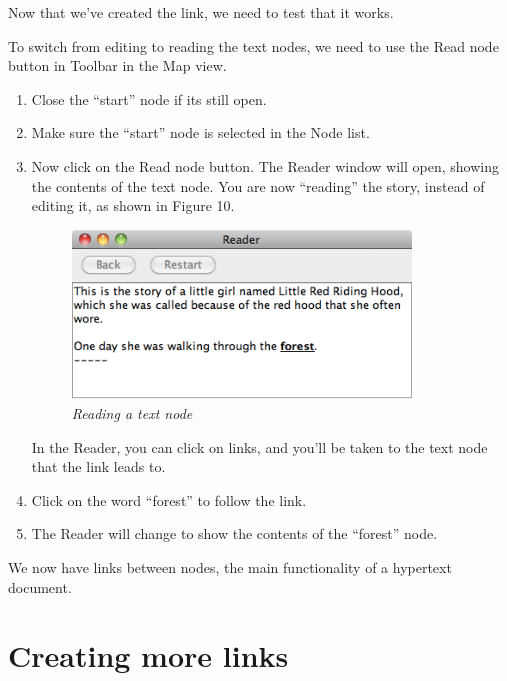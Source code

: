 \documentclass{article}
\begin{document}
Now that we've created the link, we need to test that it works.

To switch from editing to reading the text nodes, we need to use the Read node
button in Toolbar in the Map view.

\begin{enumerate}
  \item Close the ``start'' node if its still open.
  \item Make sure the ``start'' node is selected in the Node list.
  \item Now click on the Read node button. The Reader window will open, showing
  the contents of the text node. You are now ``reading'' the story, instead of
  editing it, as shown in Figure 10.

 
\begin{figure}[ht]
  \centering
  \includegraphics[width=9cm]{images/hypedyn-tutorial-1-figure-10}
  \caption{\textit{Reading a text node}}
\end{figure} 

In the Reader, you can click on links, and you'll be taken to the text node
that the link leads to.

\item Click on the word ``forest'' to follow the link.
\item The Reader will change to show the contents of the ``forest'' node.
\end{enumerate}

We now have links between nodes, the main functionality of a hypertext document.


\section{Creating more links}
\end{document}
